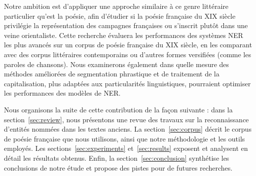 Notre ambition est d'appliquer une approche similaire à ce genre littéraire particulier qu'est la poésie, afin d'étudier si la poésie française du XIX siècle privilégie la représentation des campagnes françaises ou s'inscrit plutôt dans une veine orientaliste. Cette recherche évaluera les performances des systèmes NER les plus avancés sur un corpus de poésie française du XIX siècle, en les comparant avec des corpus littéraires contemporains ou d'autres formes versifiées (comme les paroles de chansons). Nous examinerons également dans quelle mesure des méthodes améliorées de segmentation phrastique et de traitement de la capitalisation, plus adaptées aux particularités linguistiques, pourraient optimiser les performances des modèles de NER.

Nous organisons la suite de cette contribution de la façon suivante : dans la section~\ref{sec:review}, nous présentons une revue des travaux sur la reconnaissance d'entités nommées dans les textes anciens. La section~\ref{sec:corpus} décrit le corpus de poésie française que nous utilisons, ainsi que notre méthodologie et les outils employés. Les sections~\ref{sec:experiments} et~\ref{sec:results} exposent et analysent en détail les résultats obtenus. Enfin, la section~\ref{sec:conclusion} synthétise les conclusions de notre étude et propose des pistes pour de futures recherches.

